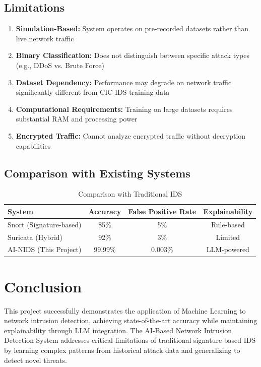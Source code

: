 \documentclass[12pt,a4paper]{article}
\begin{document}
\subsection{Limitations}

\begin{enumerate}
    \item \textbf{Simulation-Based:} System operates on pre-recorded datasets rather than live network traffic
    
    \item \textbf{Binary Classification:} Does not distinguish between specific attack types (e.g., DDoS vs. Brute Force)
    
    \item \textbf{Dataset Dependency:} Performance may degrade on network traffic significantly different from CIC-IDS training data
    
    \item \textbf{Computational Requirements:} Training on large datasets requires substantial RAM and processing power
    
    \item \textbf{Encrypted Traffic:} Cannot analyze encrypted traffic without decryption capabilities
\end{enumerate}

\subsection{Comparison with Existing Systems}

\begin{table}[H]
\centering
\begin{tabular}{|l|c|c|c|}
\hline
\textbf{System} & \textbf{Accuracy} & \textbf{False Positive Rate} & \textbf{Explainability} \\
\hline
Snort (Signature-based) & 85\% & 5\% & Rule-based \\
Suricata (Hybrid) & 92\% & 3\% & Limited \\
AI-NIDS (This Project) & 99.99\% & 0.003\% & LLM-powered \\
\hline
\end{tabular}
\caption{Comparison with Traditional IDS}
\end{table}

\section{Conclusion}

This project successfully demonstrates the application of Machine Learning to network intrusion detection, achieving state-of-the-art accuracy while maintaining explainability through LLM integration. The AI-Based Network Intrusion Detection System addresses critical limitations of traditional signature-based IDS by learning complex patterns from historical attack data and generalizing to detect novel threats.
\end{document}
